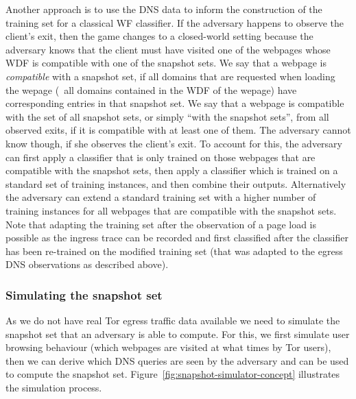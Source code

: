 Another approach is to use the DNS data to inform the construction of
the training set for a classical WF classifier.
%
If the adversary happens to observe the client's exit, then the game
changes to a closed-world setting because the adversary knows that the
client must have visited one of the webpages whose WDF is compatible
with one of the snapshot sets.
%
We say that a webpage is \emph{compatible} with a snapshot set, if all
domains that are requested when loading the wepage (\ie~all domains
contained in the WDF of the wepage) have corresponding entries in that
snapshot set. We say that a webpage is compatible with the set of all
snapshot sets, or simply ``with the snapshot sets'', from all observed
exits, if it is compatible with at least one of them.
%
The adversary cannot know though, if she observes the client's exit.
%
To account for this, the adversary can first apply a classifier that is
only trained on those webpages that are compatible with the snapshot
sets, then apply a classifier which is trained on a standard set of
training instances, and then combine their outputs.
%
Alternatively the adversary can extend a standard training set with a
higher number of training instances for all webpages that are compatible
with the snapshot sets.
%
Note that adapting the training set after the observation of a page load
is possible as the ingress trace can be recorded and first classified
after the classifier has been re-trained on the modified training set
(that was adapted to the egress DNS observations as described above).


\subsubsection{Simulating the snapshot set}
As we do not have real Tor egress traffic data available we need to
simulate the snapshot set that an adversary is able to compute. For
this, we first simulate user browsing behaviour (which webpages are
visited at what times by Tor users), then we can derive which DNS
queries are seen by the adversary and can be used to compute the
snapshot set. Figure~\ref{fig:snapshot-simulator-concept} illustrates
the simulation process.

